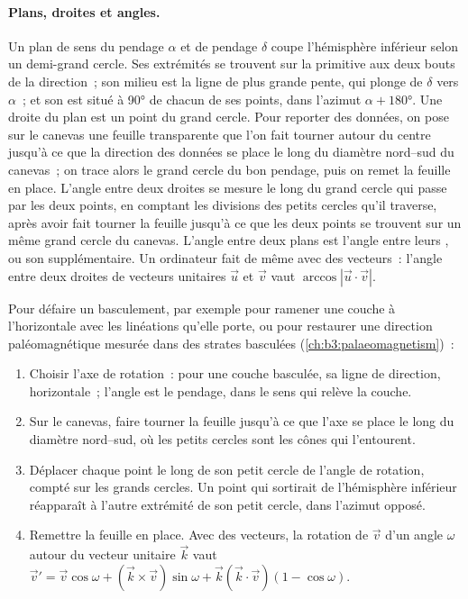 \paragraph{Plans, droites et angles.}
Un plan de sens du pendage $\alpha$ et de pendage $\delta$ coupe l'hémisphère
inférieur selon un demi-grand cercle. Ses extrémités se trouvent sur la primitive
aux deux bouts de la direction~; son milieu est la ligne de plus grande pente, qui
plonge de $\delta$ vers $\alpha$~; et son  est situé à \ang{90} de chacun de
ses points, dans l'azimut $\alpha + \ang{180}$. Une droite du plan est un point du grand
cercle. Pour reporter des données, on pose sur le canevas une feuille transparente
que l'on fait tourner autour du centre jusqu'à ce que la direction des données se place
le long du diamètre nord--sud du canevas~; on trace alors le grand cercle du bon pendage, puis on remet la feuille
en place. L'angle entre deux droites se mesure le long du grand cercle qui passe
par les deux points, en comptant les divisions des petits cercles qu'il traverse,
après avoir fait tourner la feuille jusqu'à ce que les deux points se trouvent sur un même grand cercle du canevas.
L'angle entre deux plans est l'angle entre leurs , ou son supplémentaire.
Un ordinateur fait de même avec des vecteurs~: l'angle entre deux droites de vecteurs
unitaires $\vec u$ et $\vec v$ vaut $\arccos|\vec u\cdot\vec v|$.

\begin{method}\label{met:b3:structural-analysis:rotation}
Pour défaire un basculement, par exemple pour ramener une couche à l'horizontale
avec les linéations qu'elle porte, ou pour restaurer une direction paléomagnétique
mesurée dans des strates basculées (\cref{ch:b3:palaeomagnetism})~:
\begin{enumerate}
  \item Choisir l'axe de rotation~: pour une couche basculée, sa ligne de direction,
        horizontale~; l'angle est le pendage, dans le sens qui relève la couche.
  \item Sur le canevas, faire tourner la feuille jusqu'à ce que l'axe se place le
        long du diamètre nord--sud, où les petits cercles sont les cônes qui
        l'entourent.
  \item Déplacer chaque point le long de son petit cercle de l'angle de rotation,
        compté sur les grands cercles. Un point qui sortirait de l'hémisphère
        inférieur réapparaît à l'autre extrémité de son petit cercle, dans
        l'azimut opposé.
  \item Remettre la feuille en place. Avec des vecteurs, la rotation de $\vec v$
        d'un angle $\omega$ autour du vecteur unitaire $\vec k$ vaut $\vec v' = \vec v
        \cos\omega + (\vec k\times\vec v)\sin\omega + \vec k(\vec k\cdot\vec
        v)(1 - \cos\omega)$.
\end{enumerate}
\end{method}

